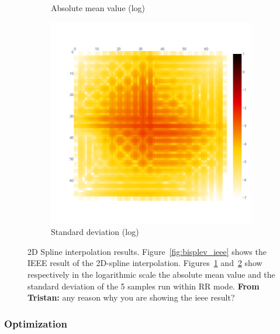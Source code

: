 \documentclass[11pt]{article}
\newcommand{\tristan}[1]{\color{orange}\textbf{From Tristan:} #1\color{black}\xspace}
\begin{document}
\begin{figure}
\begin{subfigure}{.3\textwidth}
    \caption{Absolute mean value (log)}
    \label{fig:bisplev_mean_log}
\end{subfigure}
\begin{subfigure}{.3\textwidth}
    \centering
    \includegraphics[width=\linewidth]{figure/spline_2d/bisplev_inputs_std_log.png}
    \caption{Standard deviation (log)}
    \label{fig:bisplev_std_log}
\end{subfigure}
    \caption{2D Spline interpolation results. Figure~\ref{fig:bisplev_ieee} shows the IEEE result
    of the 2D-spline interpolation. Figures~\ref{fig:bisplev_mean_log} and~\ref{fig:bisplev_std_log}
    show respectively in the logarithmic scale the absolute mean value and the standard deviation 
    of the 5 samples run within RR mode. \tristan{any reason why you are showing the ieee result?}}
    \label{fig:spline2d_rr}
\end{figure}


\subsubsection{Optimization}
\end{document}
